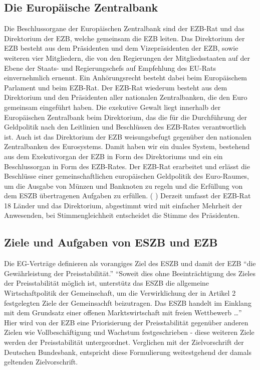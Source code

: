 \documentclass[
        onecolumn,
        a4paper,
        abstracton,
        parskip=half
        ,final
        ]{scrartcl}
\begin{document}
\subsection{Die Europ{\"a}ische Zentralbank}
Die Beschlussorgane der Europ{\"a}ischen Zentralbank sind der EZB-Rat und das Direktorium der EZB, welche gemeinsam die EZB leiten. Das Direktorium der EZB besteht aus dem Pr{\"a}sidenten und dem Vizepr{\"a}sidenten der EZB, sowie weiteren vier Mitgliedern, die von den Regierungen der Mitgliedsstaaten auf der Ebene der Staats- und Regierungschefs auf Empfehlung des EU-Rats einvernehmlich ernennt. Ein Anh{\"o}rungsrecht besteht dabei beim Europ{\"a}ischem Parlament und beim EZB-Rat.
Der EZB-Rat wiederum besteht aus dem Direktorium und den Pr{\"a}sidenten aller nationalen Zentralbanken, die den Euro gemeinsam eingef{\"u}hrt haben.
Die exekutive Gewalt liegt innerhalb der Europ{\"a}ischen Zentralbank beim Direktorium, das die f{\"u}r die Durchf{\"u}hrung der Geldpolitik nach den Leitlinien und Beschl{\"u}ssen des EZB-Rates verantwortlich ist. Auch ist das Direktorium der EZB weisungsbefugt gegen{\"u}ber den nationalen Zentralbanken des Eurosystems.  Damit haben wir ein duales System, bestehend aus dem Exekutivorgan der EZB in Form des Direktoriums und ein ein Beschlussorgan in Form des EZB-Rates.
Der EZB-Rat erarbeitet und erl{\"a}sst die Beschl{\"u}sse einer gemeinschaftlichen europ{\"a}ischen Geldpolitik des Euro-Raumes, um die Ausgabe von M{\"u}nzen und Banknoten zu regeln und die Erf{\"u}llung von dem ESZB {\"u}bertragenen Aufgaben zu erf{\"u}llen.  ( \citep[vgl.][S.553]{Basseler2010} ) Derzeit umfasst der EZB-Rat 18 L{\"a}nder und das Direktorium, abgestimmt wird mit einfacher Mehrheit der Anwesenden, bei Stimmengleichheit entscheidet die Stimme des Pr{\"a}sidenten.

\subsection{Ziele und Aufgaben von ESZB und EZB}
Die EG-Vertr{\"a}ge definieren als vorangiges Ziel des ESZB und damit der EZB "`die Gew{\"a}hrleistung der Preisstabilit{\"a}t."'
"`Soweit dies ohne Beeintr{\"a}chtigung des Zieles der Preisstabilit{\"a}t m{\"o}glich ist, unterst{\"u}tz das ESZB die allgemeine Wirtschaftpolitik der Gemeinschaft, um die Verwirklichung der in Artikel 2 festgelegten Ziele der Gemeinsachft beizutragen. Das ESZB handelt im Einklang mit dem Grundsatz einer offenen Marktswirtschaft mit freien Wettbewerb \ldots"'\citep[vgl.][S.554]{Basseler2010}
Hier wird von der EZB eine Priorisierung der Preisstabilit{\"a}t gegen{\"u}ber anderen Zielen wie Vollbesch{\"a}ftigung und Wachstum festgeschrieben - diese weiteren Ziele werden der Preisstabilit{\"a}t untergeordnet. Verglichen mit der Zielvorschrift der Deutschen Bundesbank, entspricht diese Formulierung weitestgehend der damals geltenden Zielvorschrift.\citep[vgl.][S.554]{Basseler2010}
\end{document}
